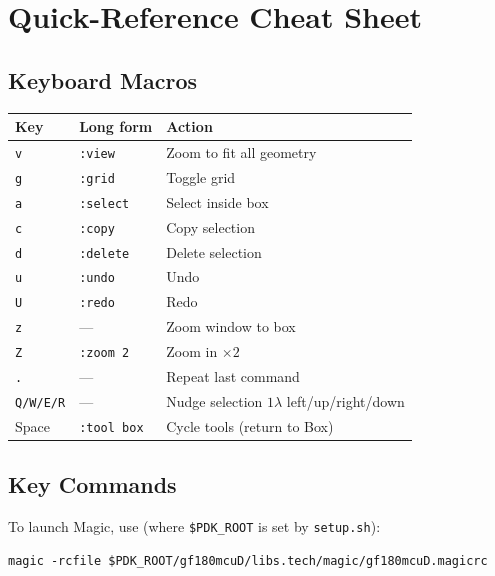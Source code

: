 \documentclass[11pt]{article}
\begin{document}
\section{Quick-Reference Cheat Sheet}

\subsection*{Keyboard Macros}

\begin{center}
\begin{tabular}{@{}lll@{}}
\toprule
\textbf{Key} & \textbf{Long form} & \textbf{Action} \\
\midrule
\texttt{v}       & \texttt{:view}     & Zoom to fit all geometry \\
\texttt{g}       & \texttt{:grid}     & Toggle grid \\
\texttt{a}       & \texttt{:select}   & Select inside box \\
\texttt{c}       & \texttt{:copy}     & Copy selection \\
\texttt{d}       & \texttt{:delete}   & Delete selection \\
\texttt{u}       & \texttt{:undo}     & Undo \\
\texttt{U}       & \texttt{:redo}     & Redo \\
\texttt{z}       & ---                & Zoom window to box \\
\texttt{Z}       & \texttt{:zoom 2}   & Zoom in $\times 2$ \\
\texttt{.}       & ---                & Repeat last command \\
\texttt{Q/W/E/R} & ---                & Nudge selection $1\lambda$
                                        left/up/right/down \\
Space            & \texttt{:tool box} & Cycle tools (return to Box) \\
\bottomrule
\end{tabular}
\end{center}

\subsection*{Key Commands}

\noindent To launch Magic, use (where \texttt{\$PDK\_ROOT} is set by \texttt{setup.sh}):
\begin{lstlisting}
magic -rcfile $PDK_ROOT/gf180mcuD/libs.tech/magic/gf180mcuD.magicrc
\end{lstlisting}
\end{document}
